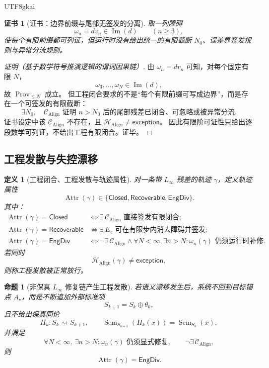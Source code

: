 \documentclass[12pt]{article}
\newtheorem{definition}{定义}[section]
\newtheorem{proposition}{命题}[section]
\newtheorem{Certificate}{证书}[section]
\newcommand{\Linfty}{\ensuremath{L_\infty}}
\newcommand{\Closed}{\mathsf{Closed}}
\newcommand{\Recoverable}{\mathsf{Recoverable}}
\newcommand{\Exc}{\mathsf{exception}}
\newcommand{\Sem}{\operatorname{Sem}}
\newcommand{\Align}{\operatorname{Align}}
\newcommand{\Prov}{\operatorname{Prov}}
\newcommand{\Imop}{\operatorname{Im}}
\newcommand{\Attr}{\operatorname{Attr}}
\newcommand{\EngDiv}{\mathsf{EngDiv}}
\begin{document}
\begin{CJK*}{UTF8}{gkai}
\begin{Certificate}[证书：边界前缀与尾部无签发的分离]
\label{cert:tex51-finite-prov-not-engineering-closure}
取一列障碍
\[
  \omega_n=dv_n\in\Imop(d)\qquad(n\ge 3),
\]
使每个有限前缀都可列证，但运行时没有给出统一的有限截断 \(N_0\)、误差界签发规则与异常分流规则。
\end{Certificate}

\begin{proof}[证明（基于数学符号推演逻辑的谓词因果链）]
由 \(\omega_n=dv_n\) 可知，对每个固定有限 \(N\)，
\[
  \omega_3,\dots,\omega_N\in\Imop(d),
\]
故 \(\Prov_{\le N}\) 成立。
但工程闭合要求的不是“每个有限前缀可写成边界”，而是存在一个可签发的有限截断：
\[
  \exists N_0,\quad
  \mathcal C_{\Align}
  \text{ 证明 }n>N_0\text{ 后的尾部残差已闭合、可忽略或被异常分流}.
\]
证书设定中该 \(\mathcal C_{\Align}\) 不存在，且 \(\mathcal H_{\Align}\ne\Exc\)。
因此有限阶可证性只给出逐段数学可列证，不给出工程有限闭合。证毕。
\end{proof}

\subsection{工程发散与失控漂移}
\label{subsec:tex51-engineering-divergence}

\begin{definition}[工程闭合、工程发散与轨迹属性]
对一条带 \(\Linfty\) 残差的轨迹 \(\gamma\)，定义轨迹属性
\[
  \Attr(\gamma)\in\{\Closed,\Recoverable,\EngDiv\}.
\]
其中：
\[
\begin{aligned}
  \Attr(\gamma)=\Closed
  &\Longleftrightarrow
  \exists\,\mathcal C_{\Align}\text{ 直接签发有限闭合};\\
  \Attr(\gamma)=\Recoverable
  &\Longleftrightarrow
  \exists\,E_\gamma\text{ 可在有限步内消去障碍并签发};\\
  \Attr(\gamma)=\EngDiv
  &\Longleftrightarrow
  \neg\exists\,\mathcal C_{\Align}
  \wedge
  \forall N<\infty,\exists n>N:
  \omega_n(\gamma)\text{ 仍须运行时补修}.
\end{aligned}
\]
若同时
\[
  \mathcal H_{\Align}(\gamma)\ne\Exc,
\]
则称工程发散被正常放行。
\end{definition}

\begin{proposition}[非保真 \texorpdfstring{\(\Linfty\)}{L-infinity} 修复链产生工程发散]
\label{prop:tex51-nonfaithful-linfty-engdiv}
若语义漂移发生后，系统不回到目标锚点 \(A_\star\)，而是不断追加外部标准项
\[
  S_{k+1}=S_k\oplus\theta_k,
\]
且不给出保真同伦
\[
  H_k:S_k\rightsquigarrow S_{k+1},
  \qquad
  \Sem_{S_{k+1}}(H_k(x))=\Sem_{S_k}(x),
\]
并满足
\[
  \forall N<\infty,\ \exists n>N:
  \omega_n(\gamma)\text{ 仍须显式修复},
  \qquad
  \neg\exists\,\mathcal C_{\Align},
\]
则
\[
  \Attr(\gamma)=\EngDiv.
\]
\end{proposition}


\end{CJK*}
\end{document}
